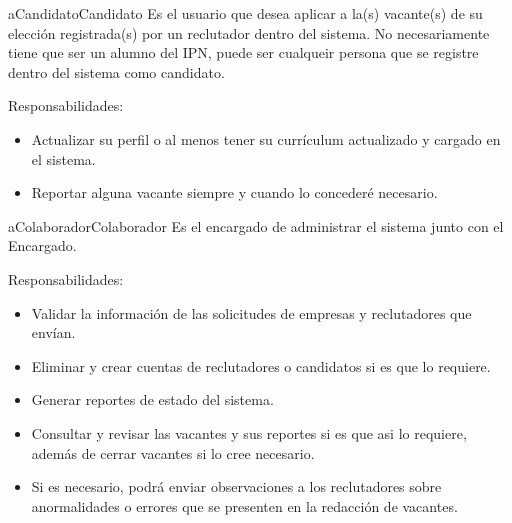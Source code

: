 \begin{actor}{aCandidato}{Candidato}{%
    Es el usuario que desea aplicar a la(s) vacante(s) de su elección registrada(s) por un reclutador dentro del sistema.
    No necesariamente tiene que ser un alumno del IPN, puede ser cualqueir persona que se registre dentro del sistema como candidato.}
     \item[Responsabilidades:] \hfill
     \begin{itemize}
         \item  Actualizar su perfil o al menos tener su currículum actualizado y cargado en el sistema.
         \item  Reportar alguna vacante siempre y cuando lo concederé necesario.
     \end{itemize}
 \end{actor}

 \begin{actor}{aColaborador}{Colaborador}{%
    Es el encargado de administrar el sistema junto con el Encargado.}
    \item[Responsabilidades:] \hfill
    \begin{itemize}
        \item Validar la información de las solicitudes de empresas y reclutadores que envían.
        \item Eliminar y crear cuentas de reclutadores o candidatos si es que lo requiere.
        \item Generar reportes de estado del sistema.
        \item Consultar y revisar las vacantes y sus reportes si es que asi lo requiere, además de cerrar vacantes si lo cree necesario.
        \item Si es necesario, podrá enviar observaciones a los reclutadores sobre anormalidades o errores que se presenten en la redacción de vacantes.
    \end{itemize}

\end{actor}

